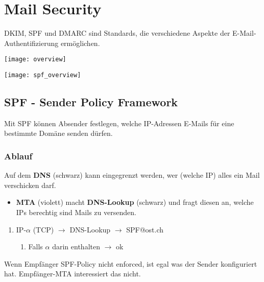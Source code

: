 

\section{Mail Security}
DKIM, SPF und DMARC sind Standards, die verschiedene Aspekte der E-Mail-Authentifizierung ermöglichen.

\begin{center}
    \texttt{[image: overview]}
\end{center}

\newpage

\begin{center}
    \texttt{[image: spf\_overview]}
\end{center}

\subsection{SPF - Sender Policy Framework}

Mit SPF können Absender festlegen, welche IP-Adressen E-Mails für eine bestimmte Domäne senden dürfen.

\subsubsection{Ablauf}
Auf dem \textbf{DNS} (schwarz) kann eingegrenzt werden, wer (welche IP) alles ein Mail verschicken darf.\\
\begin{itemize}
    \item \textcolor{OSTPink}{\textbf{MTA}} (violett) macht \textbf{DNS-Lookup} (schwarz) und fragt diesen an, welche IPs berechtig sind Mails zu versenden.\\
\end{itemize}
\begin{enumerate}
    \item IP-$\alpha$ (TCP) $\rightarrow$ DNS-Lookup $\rightarrow$ SPF@ost.ch
    \begin{enumerate}
        \item Falls $\alpha$ darin enthalten $\rightarrow$ ok\\
    \end{enumerate}
\end{enumerate}

Wenn Empfänger SPF-Policy nicht enforced, ist egal was der Sender konfiguriert hat. Empfänger-MTA interessiert das nicht.


